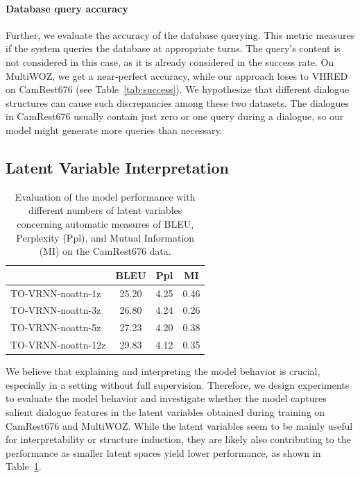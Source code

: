\paragraph{Database query accuracy}
Further, we evaluate the accuracy of the database querying.
This metric measures if the system queries the database at appropriate turns.
The query's content is not considered in this case, as it is already considered in the success rate.
On MultiWOZ, we get a near-perfect accuracy, while our approach loses to VHRED on CamRest676 (see Table~\ref{tab:success}).
We hypothesize that different dialogue structures can cause such discrepancies among these two datasets.
The dialogues in CamRest676 usually contain just zero or one query during a dialogue, so our model might generate more queries than necessary.

\subsection{Latent Variable Interpretation}

\label{05:sec:latents}
\begin{table}[tp]
    \centering\small
    \begin{tabular}{l|ccc}
      \toprule
      & BLEU & Ppl & MI  \\
    \midrule
    TO-VRNN-noattn-1z  & 25.20 & 4.25 & 0.46  \\
    TO-VRNN-noattn-3z  & 26.80 & 4.24 & 0.26  \\
    TO-VRNN-noattn-5z  & 27.23 & 4.20 & 0.38  \\
    TO-VRNN-noattn-12z  & 29.83 & 4.12 & 0.35  \\    

    \bottomrule
  \end{tabular}
  \caption{Evaluation of the model performance with different numbers of latent variables concerning automatic measures of BLEU, Perplexity (Ppl), and Mutual Information (MI) on the CamRest676 data.}
  \label{05:z_counts}
\end{table}
We believe that explaining and interpreting the model behavior is crucial, especially in a setting without full supervision.
Therefore, we design experiments to evaluate the model behavior and investigate whether the model captures salient dialogue features in the latent variables obtained during training on CamRest676 and MultiWOZ.
While the latent variables seem to be mainly useful for interpretability or structure induction, they are likely also contributing to the performance as smaller latent spaces yield lower performance, as shown in Table~\ref{05:z_counts}.

